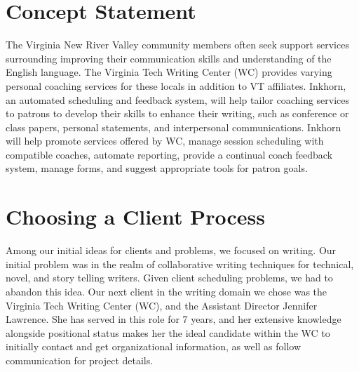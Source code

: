 \documentclass[12pt]{article} %
\begin{document}

\tableofcontents %
\newpage %


\section{Concept Statement} %


The Virginia New River Valley community members often seek support services surrounding improving their communication skills and understanding of the English language.
The Virginia Tech Writing Center (WC) provides varying personal coaching services for these locals in addition to VT affiliates.
Inkhorn, an automated scheduling and feedback system, will help tailor coaching services to patrons to develop their skills to enhance their writing, such as conference or class papers, personal statements, and interpersonal communications. 
Inkhorn will help promote services offered by WC, manage session scheduling with compatible coaches, automate reporting, provide a continual coach feedback system, manage forms, and suggest appropriate tools for patron goals.


\section{Choosing a Client Process} %

Among our initial ideas for clients and problems, we focused on writing.
Our initial problem was in the realm of collaborative writing techniques for technical, novel, and story telling writers.
Given client scheduling problems, we had to abandon this idea.
Our next client in the writing domain we chose was the Virginia Tech Writing Center (WC), and the Assistant Director Jennifer Lawrence.
She has served in this role for 7 years, and her extensive knowledge alongside positional status makes her the ideal candidate within the WC to initially contact and get organizational information, as well as follow communication for project details.
\end{document}
